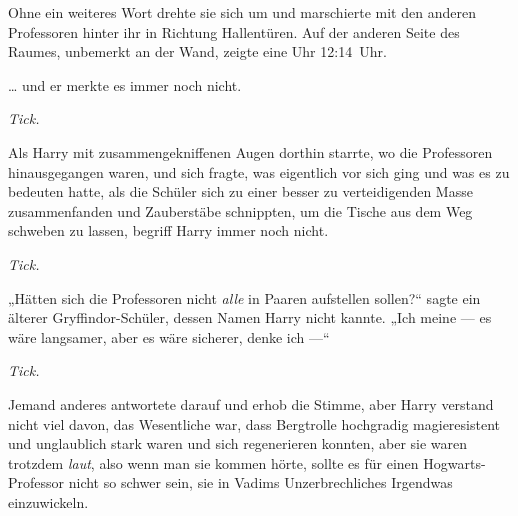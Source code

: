 
Ohne ein weiteres Wort drehte sie sich um und marschierte mit den anderen Professoren hinter ihr in Richtung Hallentüren. Auf der anderen Seite des Raumes, unbemerkt an der Wand, zeigte eine Uhr 12:14~Uhr.

\later

… und er merkte es immer noch nicht.

\emph{Tick.}

Als Harry mit zusammengekniffenen Augen dorthin starrte, wo die Professoren hinausgegangen waren, und sich fragte, was eigentlich vor sich ging und was es zu bedeuten hatte, als die Schüler sich zu einer besser zu verteidigenden Masse zusammenfanden und Zauberstäbe schnippten, um die Tische aus dem Weg schweben zu lassen, begriff Harry immer noch nicht.

\emph{Tick.}

„Hätten sich die Professoren nicht \emph{alle} in Paaren aufstellen sollen?“ sagte ein älterer Gryffindor-Schüler, dessen Namen Harry nicht kannte.
„Ich meine — es wäre langsamer, aber es wäre sicherer, denke ich —“

\emph{Tick.}

Jemand anderes antwortete darauf und erhob die Stimme, aber Harry verstand nicht viel davon, das Wesentliche war, dass Bergtrolle hochgradig magieresistent und unglaublich stark waren und sich regenerieren konnten, aber sie waren trotzdem \emph{laut}, also wenn man sie kommen hörte, sollte es für einen Hogwarts-Professor nicht so schwer sein, sie in Vadims Unzerbrechliches Irgendwas einzuwickeln.

